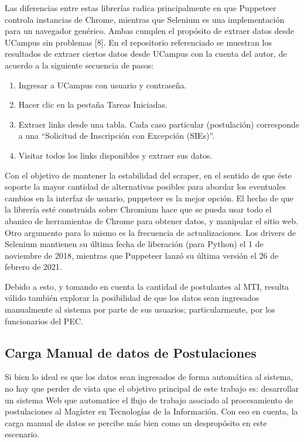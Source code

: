 Las diferencias entre estas librerías radica principalmente en que Puppeteer
controla instancias de Chrome, mientras que Selenium es una implementación para
un navegador genérico. Ambas cumplen el propósito de extraer datos desde UCampus
sin problemas [8]. En el repositorio referenciado se muestran los resultados de
extraer ciertos datos desde UCampus con la cuenta del autor, de acuerdo a la
siguiente secuencia de pasos:

\begin{enumerate}
    \item Ingresar a UCampus con usuario y contraseña.
    \item Hacer clic en la pestaña Tareas Iniciadas.
    \item Extraer links desde una tabla. Cada caso particular (postulación)
    corresponde a una “Solicitud de Inscripción con Excepción (SIEs)”.
    \item Visitar todos los links disponibles y extraer sus datos.
\end{enumerate}

Con el objetivo de mantener la estabilidad del scraper, en el sentido de que
éste soporte la mayor cantidad de alternativas posibles para abordar los
eventuales cambios en la interfaz de usuario, puppeteer es la mejor opción. El
hecho de que la librería esté construida sobre Chromium hace que se pueda usar
todo el abanico de herramientas de Chrome para obtener datos, y manipular el
sitio web. Otro argumento para lo mismo es la frecuencia de actualizaciones. Los
drivers de Selenium mantienen su última fecha de liberación (para Python) el 1
de noviembre de 2018, mientras que Puppeteer lanzó su última versión el 26 de
febrero de 2021.

Debido a esto, y tomando en cuenta la cantidad de postulantes al MTI, resulta
válido también explorar la posibilidad de que los datos sean ingresados
manualmente al sistema por parte de sus usuarios; particularmente, por los
funcionarios del PEC.

\subsection{Carga Manual de datos de Postulaciones}

Si bien lo ideal es que los datos sean ingresados de forma automática al
sistema, no hay que perder de vista que el objetivo principal de este trabajo
es: desarrollar un sistema Web que automatice el flujo de trabajo asociado al
procesamiento de postulaciones al Magíster en Tecnologías de la Información. Con
eso en cuenta, la carga manual de datos se percibe más bien como un despropósito
en este escenario.


